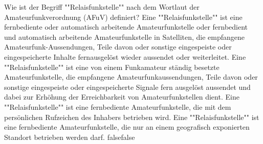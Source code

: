    {Wie ist der Begriff ""Relaisfunkstelle"" nach dem Wortlaut der Amateurfunkverordnung (AFuV) definiert?}
    {Eine ""Relaisfunkstelle"" ist eine fernbediente oder automatisch arbeitende Amateurfunkstelle oder fernbedient und automatisch arbeitende Amateurfunkstelle in Satelliten, die empfangene Amateurfunk-Aussendungen, Teile davon oder sonstige eingespeiste oder eingespeicherte Inhalte fernausgelöst wieder aussendet oder weiterleitet.}
    {Eine ""Relaisfunkstelle"" ist eine von einem Funkamateur ständig besetzte Amateurfunkstelle, die empfangene Amateurfunkaussendungen, Teile davon oder sonstige eingespeiste oder eingespeicherte Signale fern ausgelöst aussendet und dabei zur Erhöhung der Erreichbarkeit von Amateurfunkstellen dient.}
    {Eine ""Relaisfunkstelle"" ist eine fernbediente Amateurfunkstelle, die mit dem persönlichen Rufzeichen des Inhabers betrieben wird.}
    {Eine ""Relaisfunkstelle"" ist eine fernbediente Amateurfunkstelle, die nur an einem geografisch exponierten Standort betrieben werden darf.}
    {false}{false}